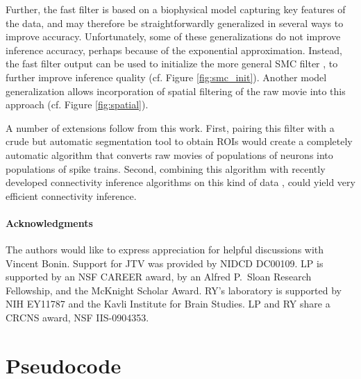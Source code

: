 \documentclass{article}
\newcommand{\foopsi}{fast }
\begin{document}
Further, the \foopsi filter is based on a biophysical model capturing key features of the data, and may therefore be straightforwardly generalized in several ways to improve accuracy.  Unfortunately, some of these generalizations do not improve inference accuracy, perhaps because of the exponential approximation.  Instead, the \foopsi filter output can be used to initialize the more general SMC filter \cite{VogelsteinPaninski09}, to further improve inference quality (cf. Figure \ref{fig:smc_init}).  Another model generalization allows incorporation of spatial filtering of the raw movie into this approach (cf. Figure \ref{fig:spatial}).  %

A number of extensions follow from this work.  First, pairing this filter with a crude but automatic segmentation tool to obtain ROIs would create a completely automatic algorithm that converts raw movies of populations of neurons into populations of spike trains.  Second, combining this algorithm with recently developed connectivity inference algorithms on this kind of data \cite{MishchenkoPaninski09}, could yield very efficient connectivity inference.

\paragraph{Acknowledgments}

The authors would like to express appreciation for helpful discussions with Vincent Bonin.  Support for JTV was provided by NIDCD DC00109. LP is supported by an NSF CAREER award, by an Alfred P.\ Sloan Research Fellowship, and the McKnight Scholar Award. RY's laboratory is supported by NIH EY11787 and the Kavli Institute for Brain Studies. LP and RY share a CRCNS award, NSF IIS-0904353.

\appendix


\section{Pseudocode} \label{sec:pseudo}
\end{document}
